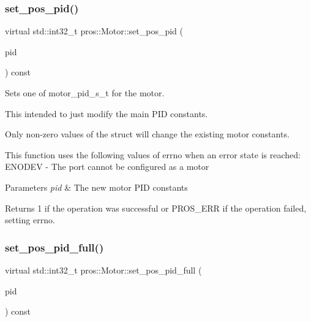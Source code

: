 \subsubsection{\texorpdfstring{set\+\_\+pos\+\_\+pid()}{set\_pos\_pid()}}
{\footnotesize\ttfamily virtual std\+::int32\+\_\+t pros\+::\+Motor\+::set\+\_\+pos\+\_\+pid (\begin{DoxyParamCaption}\item[{const \hyperlink{motors_8h_ad2e907c8d7ce53c1fd91f1b9801072e3}{motor\+\_\+pid\+\_\+s\+\_\+t}}]{pid }\end{DoxyParamCaption}) const\hspace{0.3cm}{\ttfamily [virtual]}}



Sets one of motor\+\_\+pid\+\_\+s\+\_\+t for the motor. 

This intended to just modify the main P\+ID constants.

Only non-\/zero values of the struct will change the existing motor constants.

This function uses the following values of errno when an error state is reached\+: E\+N\+O\+D\+EV -\/ The port cannot be configured as a motor


\begin{DoxyParams}{Parameters}
{\em pid} & The new motor P\+ID constants\\
\hline
\end{DoxyParams}
\begin{DoxyReturn}{Returns}
1 if the operation was successful or P\+R\+O\+S\+\_\+\+E\+RR if the operation failed, setting errno. 
\end{DoxyReturn}
\mbox{\label{classpros_1_1Motor_a67cff0666b34c3731e21e856414c2066}} 
\subsubsection{\texorpdfstring{set\+\_\+pos\+\_\+pid\+\_\+full()}{set\_pos\_pid\_full()}}
{\footnotesize\ttfamily virtual std\+::int32\+\_\+t pros\+::\+Motor\+::set\+\_\+pos\+\_\+pid\+\_\+full (\begin{DoxyParamCaption}\item[{const \hyperlink{motors_8h_a0295cbf49f5c70c17b5fa962bd25febd}{motor\+\_\+pid\+\_\+full\+\_\+s\+\_\+t}}]{pid }\end{DoxyParamCaption}) const\hspace{0.3cm}{\ttfamily [virtual]}}



